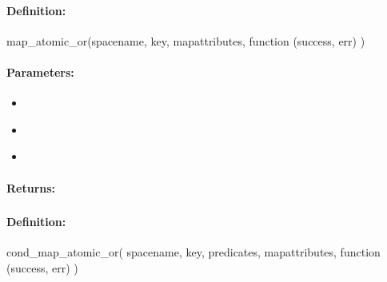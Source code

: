 \paragraph{Definition:}
\begin{javascriptcode}
map_atomic_or(spacename, key, mapattributes, function (success, err) {})
\end{javascriptcode}
\paragraph{Parameters:}
\begin{itemize}[noitemsep]
\item {}\\

\item {}\\

\item {}\\

\end{itemize}

\paragraph{Returns:}


\pagebreak
\subsubsection{}
\label{api:nodejs:cond_map_atomic_or}


\paragraph{Definition:}
\begin{javascriptcode}
cond_map_atomic_or(
        spacename, key, predicates, mapattributes, function (success, err) {})
\end{javascriptcode}
